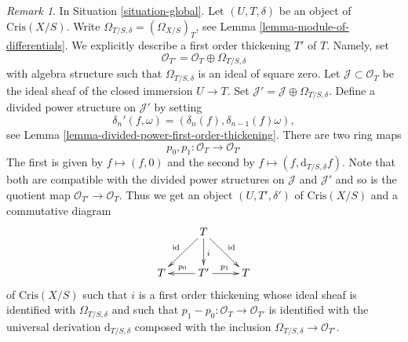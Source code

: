 \documentclass{stacks-project}
\theoremstyle{plain}
\theoremstyle{definition}
\theoremstyle{remark}
\newtheorem{remark}[subsection]{Remark}
\numberwithin{equation}{subsection}
\begin{document}
\begin{remark}
\label{remark-first-order-thickening}
In Situation \ref{situation-global}.
Let $(U, T, \delta)$ be an object of $\text{Cris}(X/S)$.
Write $\Omega_{T/S, \delta} = (\Omega_{X/S})_T$, see
Lemma \ref{lemma-module-of-differentials}.
We explicitly describe a first order thickening $T'$ of
$T$. Namely, set
$$
\mathcal{O}_{T'} = \mathcal{O}_T \oplus \Omega_{T/S, \delta}
$$
with algebra structure such that $\Omega_{T/S, \delta}$ is an
ideal of square zero. Let $\mathcal{J} \subset \mathcal{O}_T$
be the ideal sheaf of the closed immersion $U \to T$. Set
$\mathcal{J}' = \mathcal{J} \oplus \Omega_{T/S, \delta}$.
Define a divided power structure on $\mathcal{J}'$ by setting
$$
\delta_n'(f, \omega) = (\delta_n(f), \delta_{n - 1}(f)\omega),
$$
see Lemma \ref{lemma-divided-power-first-order-thickening}.
There are two ring maps
$$
p_0, p_1 : \mathcal{O}_T \to \mathcal{O}_{T'}
$$
The first is given by $f \mapsto (f, 0)$ and the second by
$f \mapsto (f, \text{d}_{T/S, \delta}f)$. Note that both are compatible
with the divided power structures on $\mathcal{J}$ and $\mathcal{J}'$
and so is the quotient map $\mathcal{O}_{T'} \to \mathcal{O}_T$.
Thus we get an object $(U, T', \delta')$ of $\text{Cris}(X/S)$
and a commutative diagram
$$
\xymatrix{
& T \ar[ld]_{\text{id}} \ar[d]^i \ar[rd]^{\text{id}} \\
T & T' \ar[l]_{p_0} \ar[r]^{p_1} & T
}
$$
of $\text{Cris}(X/S)$ such that $i$ is a first order thickening whose ideal
sheaf is identified with $\Omega_{T/S, \delta}$ and such that
$p_1 - p_0 : \mathcal{O}_T \to \mathcal{O}_{T'}$
is identified with the universal derivation $\text{d}_{T/S, \delta}$
composed with the inclusion $\Omega_{T/S, \delta} \to \mathcal{O}_{T'}$.
\end{remark}
\end{document}
